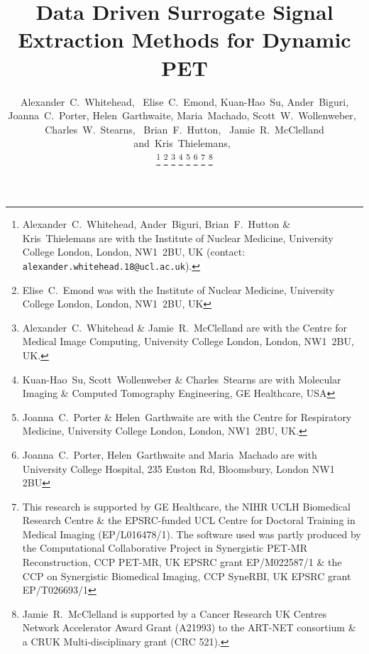 \documentclass[10pt, twocolumn, twoside, letterpaper]{IEEEtran}
\begin{document}
\title{Data Driven Surrogate Signal Extraction Methods for Dynamic PET}

\pagestyle{plain}

\author{Alexander~C.~Whitehead,~
        Elise~C.~Emond,
        Kuan-Hao~Su,
        Ander~Biguri,
        Joanna~C.~Porter,
        Helen~Garthwaite,
        Maria~Machado,
        Scott~W.~Wollenweber,~
        Charles~W.~Stearns,~
        Brian~F.~Hutton,~
        Jamie~R.~McClelland
        and~Kris~Thielemans,~%
        
    \vspace{-1.0cm}

    \thanks{Alexander~C.~Whitehead, Ander~Biguri, Brian~F.~Hutton \& Kris~Thielemans are with the Institute of Nuclear Medicine, University College London, London, NW1~2BU, UK (contact: \texttt{alexander.whitehead.18@ucl.ac.uk}).}%
    \thanks{Elise~C.~Emond was with the Institute of Nuclear Medicine, University College London, London, NW1~2BU, UK}
    \thanks{Alexander~C.~Whitehead \& Jamie~R.~McClelland are with the Centre for Medical Image Computing, University College London, London, NW1~2BU, UK.}%
    \thanks{Kuan-Hao~Su, Scott~Wollenweber \& Charles~Stearns are with Molecular Imaging \& Computed Tomography Engineering, GE Healthcare, USA}%
    \thanks{Joanna~C.~Porter \& Helen~Garthwaite are with the Centre for Respiratory Medicine, University College London, London, NW1~2BU, UK.}%
    \thanks{Joanna~C.~Porter, Helen~Garthwaite and Maria~Machado are with University College Hospital, 235 Euston Rd, Bloomsbury, London NW1 2BU}%
    \thanks{This research is supported by GE Healthcare, the NIHR UCLH Biomedical Research Centre \& the EPSRC-funded UCL Centre for Doctoral Training in Medical Imaging (EP/L016478/1). The software used was partly produced by the Computational Collaborative Project in Synergistic PET-MR Reconstruction, CCP PET-MR, UK EPSRC grant EP/M022587/1 \& the CCP on Synergistic Biomedical Imaging, CCP SyneRBI, UK EPSRC grant EP/T026693/1}%
    \thanks{Jamie~R.~McClelland is supported by a Cancer Research UK Centres Network Accelerator Award Grant (A21993) to the ART-NET consortium \& a CRUK Multi-disciplinary grant (CRC 521).}%
}

\maketitle
\IEEEpeerreviewmaketitle
\end{document}
